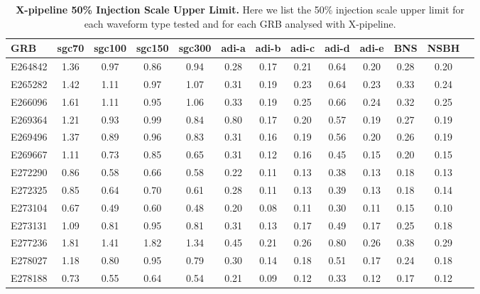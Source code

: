 \documentclass[11pt]{cuthesis}
\newcommand{\xpfs}{X-pipeline. }
\begin{document}
\begin{landscape}
\begin{table}[p]
\centering
\begin{tabular}{l c  c  c  c  c  c  c  c c c c c |}
\hline
GRB & sgc70 & sgc100 & sgc150 & sgc300 & adi-a & adi-b & adi-c & adi-d & adi-e & BNS & NSBH \\     
\hline                                                             
E264842 & 1.36 & 0.97 & 0.86 & 0.94 & 0.28 & 0.17 & 0.21 & 0.64 & 0.20 & 0.28 & 0.20 \\
E265282 & 1.42 & 1.11 & 0.97 & 1.07 & 0.31 & 0.19 & 0.23 & 0.64 & 0.23 & 0.33 & 0.24 \\
E266096 & 1.61 & 1.11 & 0.95 & 1.06 & 0.33 & 0.19 & 0.25 & 0.66 & 0.24 & 0.32 & 0.25 \\
E269364 & 1.21 & 0.93 & 0.99 & 0.84 & 0.80 & 0.17 & 0.20 & 0.57 & 0.19 & 0.27 & 0.19 \\
E269496 & 1.37 & 0.89 & 0.96 & 0.83 & 0.31 & 0.16 & 0.19 & 0.56 & 0.20 & 0.26 & 0.19 \\
E269667 & 1.11 & 0.73 & 0.85 & 0.65 & 0.31 & 0.12 & 0.16 & 0.45 & 0.15 & 0.20 & 0.15 \\
E272290 & 0.86 & 0.58 & 0.66 & 0.58 & 0.22 & 0.11 & 0.13 & 0.38 & 0.13 & 0.18 & 0.13 \\
E272325 & 0.85 & 0.64 & 0.70 & 0.61 & 0.28 & 0.11 & 0.13 & 0.39 & 0.13 & 0.18 & 0.14 \\
E273104 & 0.67 & 0.49 & 0.60 & 0.48 & 0.20 & 0.08 & 0.11 & 0.30 & 0.11 & 0.15 & 0.10 \\
E273131 & 1.09 & 0.81 & 0.95 & 0.81 & 0.31 & 0.13 & 0.17 & 0.49 & 0.17 & 0.25 & 0.18 \\
E277236 & 1.81 & 1.41 & 1.82 & 1.34 & 0.45 & 0.21 & 0.26 & 0.80 & 0.26 & 0.38 & 0.29 \\
E278027 & 1.18 & 0.80 & 0.95 & 0.79 & 0.30 & 0.14 & 0.18 & 0.51 & 0.17 & 0.24 & 0.18 \\
E278188 & 0.73 & 0.55 & 0.64 & 0.54 & 0.21 & 0.09 & 0.12 & 0.33 & 0.12 & 0.17 & 0.12 \\
\end{tabular}
\caption{\textbf{X-pipeline 50\% Injection Scale Upper Limit.} Here we list the 50\% injection scale upper limit for each waveform type tested and for each GRB analysed with \xpfs}
\label{tab:xp_sensitivity}
\end{table}
\end{landscape}
\backmatter



\end{document}
